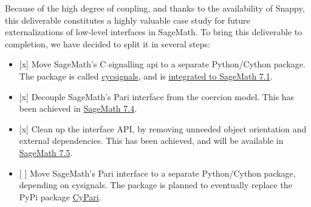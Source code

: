 Because of the high degree of coupling, and thanks to the availability
of Snappy, this deliverable constitutes a highly valuable case study for
future externalizations of low-level interfaces in SageMath. To bring
this deliverable to completion, we have decided to split it in several
steps:

\begin{itemize}
\tightlist
\item
  {[}x{]} Move SageMath's C signalling api to a separate Python/Cython
  package. The package is called
  \href{https://github.com/sagemath/cysignals}{cycsignals}, and is
  \href{http://trac.sagemath.org/ticket/20002}{integrated to SageMath
  7.1}.
\item
  {[}x{]} Decouple SageMath's Pari interface from the coercion model.
  This has been achieved in
  \href{http://trac.sagemath.org/ticket/21158}{SageMath 7.4}.
\item
  {[}x{]} Clean up the interface API, by removing unneeded object
  orientation and external dependencies. This has been achieved, and
  will be available in
  \href{http://trac.sagemath.org/ticket/20241}{SageMath 7.5}.
\item
  {[} {]} Move SageMath's Pari interface to a separate Python/Cython
  package, depending on cysignals. The package is planned to eventually
  replace the PyPi package
  \href{https://pypi.python.org/pypi/cypari/}{CyPari}.
\end{itemize}
